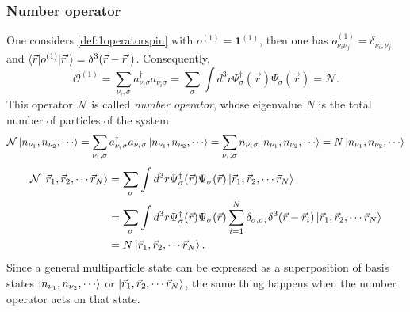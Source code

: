 \documentclass[a4paper,12pts]{article}
\numberwithin{equation}{section}
\begin{document}
	\subsubsection{Number operator}
	One considers \ref{def:1operatorspin} with $o^{(1)}=\mathbf{1}^{(1)}$, then one has $o^{(1)}_{\nu_i\nu_j}=\delta_{\nu_i,\nu_j}$ and $\braket{\vec{r}|o^{(1)}|\vec{r}'} = \delta^3(\vec{r}-\vec{r}')$. Consequently,
	\begin{equation}
	\mathcal{O}^{(1)} = \sum_{\nu_i,\sigma}a^{\dagger}_{\nu_i\sigma}a_{\nu_i\sigma} = \sum_{\sigma}\int d^3r \Psi^{\dagger}_{\sigma}(\vec{r})\Psi_{\sigma}(\vec{r}) = \mathcal{N}.
	\end{equation}
	This operator $\mathcal{N}$ is called \textit{number operator}, whose eigenvalue $N$ is the total number of particles of the system
	\begin{align}
	\mathcal{N}\ket{n_{\nu_1},n_{\nu_2},\cdots} = \sum_{\nu_i,\sigma}a^{\dagger}_{\nu_i\sigma}a_{\nu_i\sigma}\ket{n_{\nu_1},n_{\nu_2},\cdots} = \sum_{\nu_i,\sigma}n_{\nu_i\sigma}\ket{n_{\nu_1},n_{\nu_2},\cdots} = N\ket{n_{\nu_1},n_{\nu_2},\cdots}
	\end{align}
	\begin{align}
	\mathcal{N}\ket{\vec{r}_1,\vec{r}_2,\cdots\vec{r}_N} &= \sum_{\sigma}\int d^3r \Psi^{\dagger}_{\sigma}(\vec{r})\Psi_{\sigma}(\vec{r})\ket{\vec{r}_1,\vec{r}_2,\cdots\vec{r}_N} \\ &= \sum_{\sigma}\int d^3r \Psi^{\dagger}_{\sigma}(\vec{r})\Psi_{\sigma}(\vec{r})\sum^N_{i=1} \delta_{\sigma,\sigma_i}\delta^3(\vec{r}-\vec{r}_i)\ket{\vec{r}_1,\vec{r}_2,\cdots\vec{r}_N} \\ &= N\ket{\vec{r}_1,\vec{r}_2,\cdots\vec{r}_N}.
	\end{align}
	Since a general multiparticle state can be expressed as a superposition of basis states $\ket{n_{\nu_1},n_{\nu_2},\cdots}$ or $\ket{\vec{r}_1,\vec{r}_2,\cdots\vec{r}_N}$, the same thing happens when the number operator acts on that state.
\end{document}

